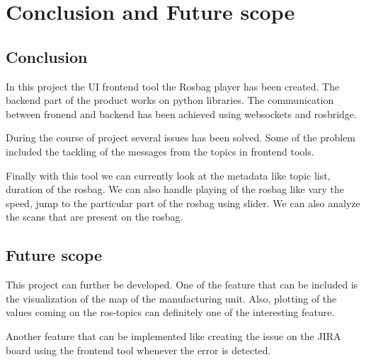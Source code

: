 \chapter{Conclusion and Future scope}
\section{Conclusion}
In this project the UI frontend tool the Rosbag player has been created. The backend part of the product works on python libraries. The communication between fronend and backend has been achieved using websockets and rosbridge. 

During the course of project several issues has been solved. Some of the problem included the tackling of the messages from the topics in frontend tools.

Finally with this tool we can currently look at the metadata like topic list, duration of the rosbag. We can also handle playing of the rosbag like vary the speed, jump to the particular part of the rosbag using slider. We can also analyze the scans that are present on the rosbag. 

\section{Future scope}

This project can further be developed. One of the feature that can be included is the visualization of the map of the manufacturing unit. Also, plotting of the values coming on the ros-topics can definitely one of the interesting feature. 

Another feature that can be implemented like creating the issue on the JIRA board using the frontend tool whenever the error is detected.